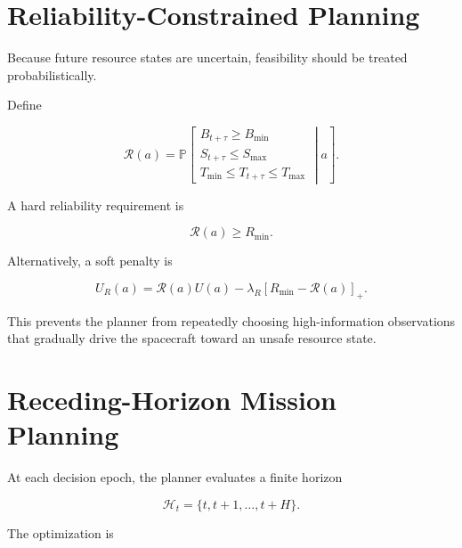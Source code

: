 \documentclass[11pt,a4paper]{article}
\newcommand{\Prob}{\mathbb{P}}
\begin{document}

\section{Reliability-Constrained Planning}

Because future resource states are uncertain, feasibility should be
treated probabilistically.

Define

\begin{equation}
\mathcal R(a)
=
\Prob
\left[
\begin{array}{c}
B_{t+\tau}\geq B_{\min}\\
S_{t+\tau}\leq S_{\max}\\
T_{\min}\leq T_{t+\tau}\leq T_{\max}
\end{array}
\middle|a
\right].
\end{equation}

A hard reliability requirement is

\begin{equation}
\mathcal R(a)
\geq
R_{\min}.
\end{equation}

Alternatively, a soft penalty is

\begin{equation}
U_R(a)
=
\mathcal R(a)U(a)
-
\lambda_R
[
R_{\min}-\mathcal R(a)
]_+.
\end{equation}

This prevents the planner from repeatedly choosing high-information
observations that gradually drive the spacecraft toward an unsafe
resource state.


\section{Receding-Horizon Mission Planning}

At each decision epoch, the planner evaluates a finite horizon

\begin{equation}
\mathcal H_t
=
\{t,t+1,\ldots,t+H\}.
\end{equation}

The optimization is
\end{document}
